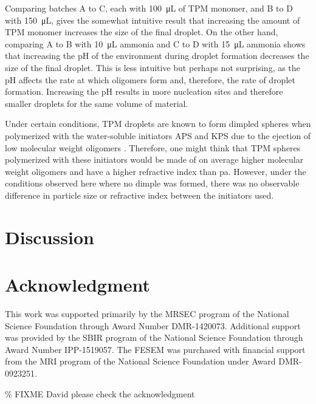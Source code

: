 Comparing batches A to C, each with \SI{100}{\micro \liter} of TPM monomer, and B to D with
\SI{150}{\micro \liter}, gives the somewhat intuitive result that increasing the amount of TPM
monomer increases the size of the final droplet. On the other hand, comparing A to B with
\SI{10}{\micro \liter} ammonia and C to D with \SI{15}{\micro \liter} ammonia shows that
increasing the pH of the environment during droplet formation decreases the size of the 
final droplet. This is less intuitive but perhaps not surprising, as the pH 
affects the rate at which oligomers form and, therefore, the rate of droplet 
formation. Increasing the pH results in more nucleation sites and therefore smaller droplets 
for the same volume of material. 

Under certain conditions, TPM droplets are known to form dimpled spheres when polymerized
with the water-soluble initiators APS and KPS due to the ejection of low molecular weight
oligomers \cite{sacanna11}. %
Therefore, one might think that TPM spheres polymerized with these initiators would be
made of on average higher molecular weight oligomers and have a higher refractive index
than pa. However, under the conditions observed here where no dimple was formed, there
was no observable difference in particle size or refractive index between the initiators
used.

\section{Discussion}

\section{Acknowledgment}

This work was supported primarily by the MRSEC program of
the National Science Foundation through Award Number DMR-1420073.
Additional support was provided by the SBIR program of the
National Science Foundation through Award Number IPP-1519057.
The FESEM was purchased with financial support from the MRI program
of the National Science Foundation under Award DMR-0923251.

\% FIXME David please check the acknowledgment
